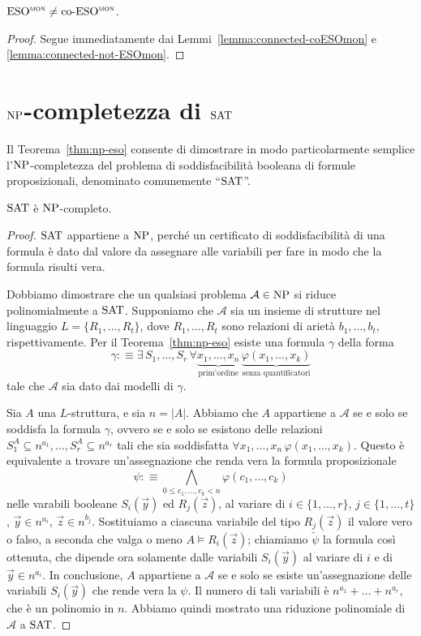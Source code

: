 \begin{teorema}
  $\operatorname{ESO^{\normalfont\textsc{mon}}} \neq \operatorname{co-ESO^{\normalfont\textsc{mon}}}$.
\end{teorema}

\begin{proof}
  Segue immediatamente dai Lemmi~\ref{lemma:connected-coESOmon} e \ref{lemma:connected-not-ESOmon}.
\end{proof}




\section{\texorpdfstring{$\operatorname{NP}$}{NP}-completezza di \texorpdfstring{$\operatorname{SAT}$}{SAT}}

Il Teorema~\ref{thm:np-eso} consente di dimostrare in modo particolarmente semplice l'$\operatorname{NP}$-com\-ple\-tez\-za del problema di soddisfacibilità booleana di formule proposizionali, denominato comunemente ``$\operatorname{SAT}$''.

\begin{teorema}
  $\operatorname{SAT}$ è $\operatorname{NP}$-completo.
\end{teorema}

\begin{proof}
  $\operatorname{SAT}$ appartiene a $\operatorname{NP}$, perché un certificato di soddisfacibilità di una formula è dato dal valore da assegnare alle variabili per fare in modo che la formula risulti vera.
  
  Dobbiamo dimostrare che un qualsiasi problema $\mathcal{A}\in\operatorname{NP}$ si riduce polinomialmente a $\operatorname{SAT}$.
  Supponiamo che $\mathcal{A}$ sia un insieme di strutture nel linguaggio $L=\{R_1,\dots,R_t\}$, dove $R_1,\dots,R_t$ sono relazioni di arietà $b_1,\dots,b_t$, rispettivamente.
  Per il Teorema~\ref{thm:np-eso} esiste una formula $\gamma$ della forma
  \[ \gamma :\equiv \exists\, S_1,\dots,S_r \, \forall \underbrace{x_1,\dots,x_n}_{\text{prim'ordine}} \, \underbrace{\varphi(x_1,\dots,x_k)}_{\text{senza quantificatori}} \]
  tale che $\mathcal{A}$ sia dato dai modelli di $\gamma$.
  
  Sia $A$ una $L$-struttura, e sia $n=|A|$. Abbiamo che $A$ appartiene a $\mathcal{A}$ se e solo se soddisfa la formula $\gamma$, ovvero se e solo se esistono delle relazioni $S_1^A\subseteq n^{a_1}, \dots, S_r^A\subseteq n^{a_r}$ tali che sia soddisfatta $\forall x_1,\dots,x_n \,\varphi(x_1,\dots,x_k)$.
  Questo è equivalente a trovare un'assegnazione che renda vera la formula proposizionale
  \[ \psi :\equiv \bigwedge_{0\leq c_1,\dots,c_k < n} \varphi(c_1,\dots,c_k) \]
  nelle varabili booleane $S_i(\vec{y})$ ed $R_j(\vec{z})$, al variare di $i\in \{1,\ldots,r\}$, $j\in\{1,\dots,t\}$, $\vec{y}\in n^{a_i}$, $\vec{z}\in n^{b_j}$.
  Sostituiamo a ciascuna variabile del tipo $R_j(\vec{z})$ il valore vero o falso, a seconda che valga o meno $A \models R_i(\vec{z})$; chiamiamo $\tilde\psi$ la formula così ottenuta, che dipende ora solamente dalle variabili $S_i(\vec{y})$ al variare di $i$ e di $\vec{y}\in n^{a_i}$.
  In conclusione, $A$ appartiene a $\mathcal{A}$ se e solo se esiste un'assegnazione delle variabili $S_i(\vec{y})$ che rende vera la $\psi$. Il numero di tali variabili è $n^{a_1}+\ldots+n^{a_r}$, che è un polinomio in $n$.
  Abbiamo quindi mostrato una riduzione polinomiale di $\mathcal{A}$ a $\operatorname{SAT}$.
\end{proof}
